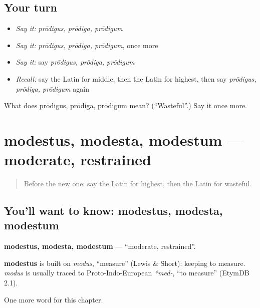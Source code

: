 \subsection*{Your turn}
\begin{itemize}
\raggedright
  \item \emph{Say it:} \emph{prōdigus, prōdiga, prōdigum}
  \item \emph{Say it:} \emph{prōdigus, prōdiga, prōdigum}, once more
  \item \emph{Say it:} say \emph{prōdigus, prōdiga, prōdigum}
  \item \emph{Recall:} say the Latin for middle, then the Latin for highest, then say \emph{prōdigus, prōdiga, prōdigum} again
\end{itemize}

\begin{tcolorbox}[breakable,colback=teal!4,colframe=teal!35!black,title={Before you move on}]
What does prōdigus, prōdiga, prōdigum mean? (\textquotedblleft{}Wasteful\textquotedblright{}.) Say it once more.
\end{tcolorbox}
\section[modestus, modesta, modestum]{modestus, modesta, modestum — moderate, restrained}

\label{lesson:LA-C184-modestus}



\begin{quote}
Before the new one: say the Latin for highest, then the Latin for wasteful.
\end{quote}

\subsection*{You'll want to know: modestus, modesta, modestum}
\textbf{modestus, modesta, modestum} — \textquotedblleft{}moderate, restrained\textquotedblright{}.

\begin{cousinweb}
\textbf{modestus} is built on \emph{modus}, \textquotedblleft{}measure\textquotedblright{} (Lewis \& Short): keeping to measure. \emph{modus} is usually traced to Proto-Indo-European \emph{*med-}, \textquotedblleft{}to measure\textquotedblright{} (EtymDB 2.1).
\end{cousinweb}

\begin{grammarlens}[title={What you've built}]
One more word for this chapter.
\end{grammarlens}

